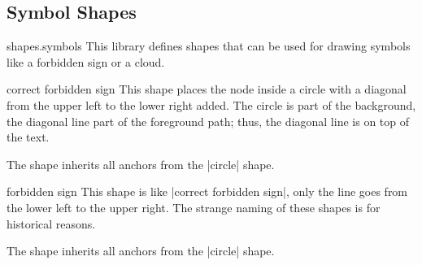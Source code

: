 \subsection{Symbol Shapes}

\begin{pgflibrary}{shapes.symbols}
  This library defines shapes that can be used for drawing symbols
  like a forbidden sign or a cloud.
\end{pgflibrary}



\begin{shape}{correct forbidden sign}
  This shape places the node inside a circle with a diagonal from the
  upper left to the lower right added. The circle is part of the
  background, the diagonal line part of the foreground path; thus, the
  diagonal line is on top of the text.

\begin{codeexample}[]
\end{codeexample}

  The shape inherits all anchors from the |circle| shape.
\end{shape}

\begin{shape}{forbidden sign}
  This shape is like |correct forbidden sign|, only the line goes from
  the lower left to the upper right. The strange naming of these
  shapes is for historical reasons.

\begin{codeexample}[]
\end{codeexample}

  The shape inherits all anchors from the |circle| shape.
\end{shape}


